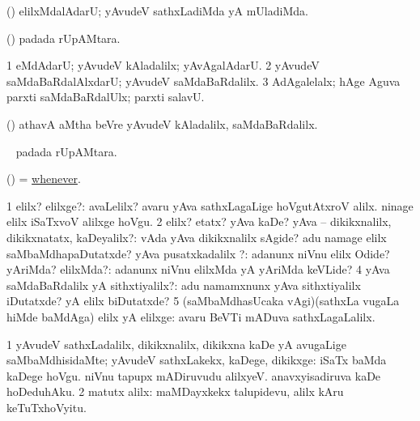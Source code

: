 \bentry
{} 
\expl{}
\bmng
(\aupa) elilxMdalAdarU; yAvudeV sathxLadiMda yA mUladiMda. 
\emng
\eentry

\bentry
{} 
\expl{}
\bmng
(\kAparx) padada rUpAMtara. 
\emng
\eentry

\bentry
{} 
\expl{}
\bmng
\bnum
\num{1} eMdAdarU; yAvudeV kAladalilx; yAvAgalAdarU. 
\num{2} yAvudeV saMdaBaRdalAlxdarU; yAvudeV saMdaBaRdalilx. 
\num{3} AdAgalelalx; hAge Aguva parxti saMdaBaRdalUlx; parxti salavU. 
\enum
\emng

\noindent 
\gl{\pagu}
\expl{}
\bmng
{} (\AmA) athavA aMtha beVre yAvudeV kAladalilx, saMdaBaRdalilx. 
\emng
\eentry

\bentry
{} 
\expl{}
\bmng
\kirxvi\  padada rUpAMtara. 
\emng
\eentry

\bentry
{} 
\expl{}
\bmng
 \kirxvi (\aupa) = \hyperlink{whenever}{whenever}. 
\emng
\eentry

\bentry
{} 
\expl{}
\bmng
\bnum
\num{1} elilx? elilxge?:  avaLelilx?  avaru yAva sathxLagaLige hoVgutAtxroV alilx.  ninage elilx iSaTxvoV alilxge hoVgu. 
\num{2} elilx? etatx? yAva kaDe? yAva -- dikikxnalilx, dikikxnatatx, kaDeyalilx?:  vAda yAva dikikxnalilx sAgide?  adu namage elilx saMbaMdhapaDutatxde? 
\banum
{} yAva pusatxkadalilx \mo?:  adanunx niVnu elilx Odide? 
 yAriMda? elilxMda?:  adanunx niVnu elilxMda yA yAriMda keVLide? 
\eanum
\numie
\num{4} yAva saMdaBaRdalilx yA sithxtiyalilx?:  adu namamxnunx yAva sithxtiyalilx iDutatxde? yA elilx biDutatxde? 
\num{5} (saMbaMdhasUcaka \kirxvi vAgi)(sathxLa \mo vugaLa hiMde baMdAga) elilx yA elilxge:  avaru BeVTi mADuva sathxLagaLalilx. 
\enum
\emng
\eentry

\bentry
{} 
\gl{\saMavayx}
\expl{}
\bmng
\bnum
\num{1} yAvudeV sathxLadalilx, dikikxnalilx, dikikxna kaDe yA avugaLige saMbaMdhisidaMte; yAvudeV sathxLakekx, kaDege, dikikxge:  iSaTx baMda kaDege hoVgu.  niVnu tapupx mADiruvudu alilxyeV.  anavxyisadiruva kaDe hoDeduhAku. 
\num{2} matutx alilx:  maMDayxkekx talupidevu, alilx kAru keTuTxhoVyitu. 
\enum
\emng
\eentry

